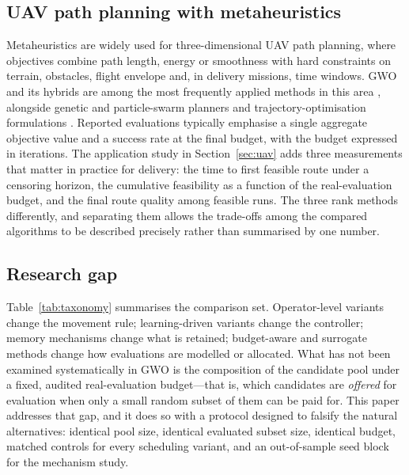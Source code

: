 \documentclass[11pt,a4paper]{article}
\begin{document}
\subsection{UAV path planning with metaheuristics}
Metaheuristics are widely used for three-dimensional UAV path planning, where
objectives combine path length, energy or smoothness with hard constraints on
terrain, obstacles, flight envelope and, in delivery missions, time windows.
GWO and its hybrids are among the most frequently applied methods in this area
\citep{nayeem2025drones,jia2025drones,huang2026qlfdgwo}, alongside genetic and
particle-swarm planners and trajectory-optimisation formulations
\citep{roberge2013uav,besada2010uav,zeng2017uav}. Reported evaluations
typically emphasise a single aggregate objective value and a success rate at
the final budget, with the budget expressed in iterations. The application
study in Section~\ref{sec:uav} adds three measurements that matter in practice
for delivery: the time to first feasible route under a censoring horizon, the
cumulative feasibility as a function of the real-evaluation budget, and the
final route quality among feasible runs. The three rank methods differently,
and separating them allows the trade-offs among the compared algorithms to be
described precisely rather than summarised by one number.

\subsection{Research gap}
Table~\ref{tab:taxonomy} summarises the comparison set. Operator-level variants
change the movement rule; learning-driven variants change the controller;
memory mechanisms change what is retained; budget-aware and surrogate methods
change how evaluations are modelled or allocated. What has not been examined
systematically in GWO is the composition of the candidate pool under a fixed,
audited real-evaluation budget---that is, which candidates are \emph{offered}
for evaluation when only a small random subset of them can be paid for. This
paper addresses that gap, and it does so with a protocol designed to falsify
the natural alternatives: identical pool size, identical evaluated subset
size, identical budget, matched controls for every scheduling variant, and an
out-of-sample seed block for the mechanism study.

\begin{table}[t]
\centering
\small
\caption{Research lines in GWO and expensive optimization, and their relation
to the present work.}
\label{tab:taxonomy}
\resizebox{\linewidth}{!}{}
\end{table}
\end{document}
